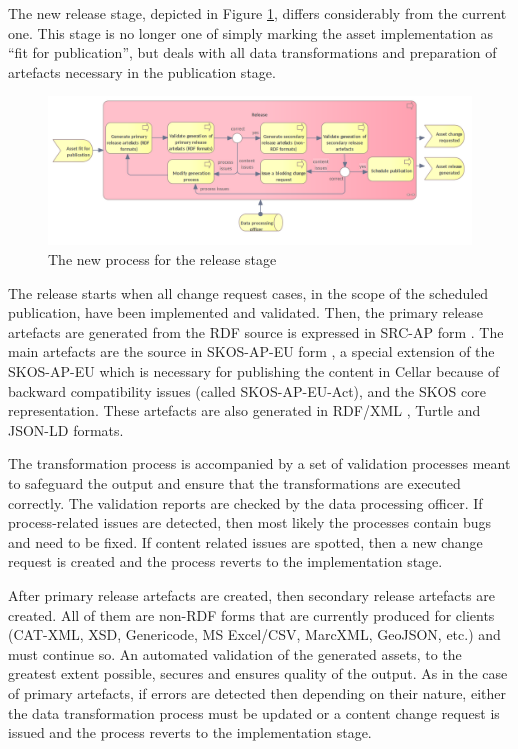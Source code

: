 	The new release stage, depicted in Figure \ref{fig:release-new}, differs considerably from the current one. This stage is no longer one of simply marking the asset implementation as ``fit for publication'', but deals with all data transformations and preparation of artefacts necessary in the publication stage.
	
	\begin{figure}[h]
		\centering
		\includegraphics[width=1.05\textwidth]{images/business/new/Release.png}
		\caption{The new process for the release stage}
		\label{fig:release-new}
	\end{figure}

	The release starts when all change request cases, in the scope of the scheduled publication, have been implemented and validated. Then, the primary release artefacts are generated from the RDF source is expressed in SRC-AP form \citep{src-ap-vb3}. The main artefacts are the source in SKOS-AP-EU form \citep{skos-ap-eu}, a special extension of the SKOS-AP-EU which is necessary for publishing the content in Cellar because of backward compatibility issues (called SKOS-AP-EU-Act), and the SKOS core \citep{skos-spec} representation. These artefacts are also generated in RDF/XML \citep{rdf-xml-Schreiber:14:RXS,rdf-xml-Beckett:04:RSS}, Turtle \citep{turtle-Carothers:14:RT} and JSON-LD \citep{sporny2014json,spornyjson} formats. 
	
	The transformation process is accompanied by a set of validation processes meant to safeguard the output and ensure that the transformations are executed correctly. The validation reports are checked by the data processing officer. If process-related issues are detected, then most likely the processes contain bugs and need to be fixed. If content related issues are spotted, then a new change request is created and the process reverts to the implementation stage. 
	
	After primary release artefacts are created, then secondary release artefacts are created. All of them are non-RDF forms that are currently produced for clients (CAT-XML, XSD, Genericode, MS Excel/CSV, MarcXML, GeoJSON, etc.) and must continue so. An automated validation of the generated assets, to the greatest extent possible, secures and ensures quality of the output. As in the case of primary artefacts, if errors are detected then depending on their nature, either the data transformation process must be updated or a content change request is issued and the process reverts to the implementation stage. 
	
